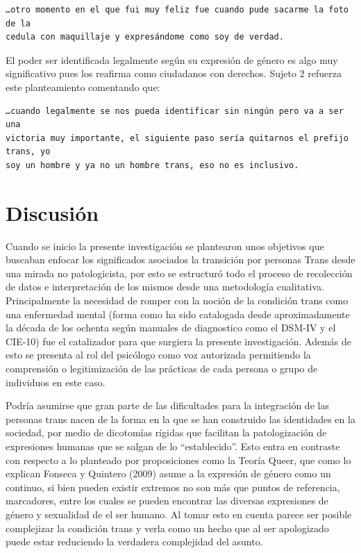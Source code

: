 \begin{verbatim}
…otro momento en el que fui muy feliz fue cuando pude sacarme la foto de la
cedula con maquillaje y expresándome como soy de verdad.
\end{verbatim}

El poder ser identificada legalmente según su expresión de género es algo muy
significativo pues los reafirma como ciudadanos con derechos. Sujeto 2 refuerza
este planteamiento comentando que:

\begin{verbatim}
…cuando legalmente se nos pueda identificar sin ningún pero va a ser una
victoria muy importante, el siguiente paso sería quitarnos el prefijo trans, yo
soy un hombre y ya no un hombre trans, eso no es inclusivo.
\end{verbatim}

\section{Discusión}\label{sec:discusion}

Cuando se inicio la presente investigación se plantearon unos objetivos que
buscaban enfocar los significados asociados la transición por personas Trans
desde una mirada no patologicista, por esto se estructuró todo el proceso de
recolección de datos e interpretación de los mismos desde una metodología
cualitativa. Principalmente la necesidad de romper con la noción de la condición
trans como una enfermedad mental (forma como ha sido catalogada desde
aproximadamente la década de los ochenta según manuales de diagnostico como el
DSM-IV y el CIE-10) fue el catalizador para que surgiera la presente
investigación. Además de esto se presenta al rol del psicólogo como voz
autorizada permitiendo la comprensión o legitimización de las prácticas de cada
persona o grupo de individuos en este caso.

Podría asumirse que gran parte de las dificultades para la integración de las
personas trans nacen de la forma en la que se han construido las identidades en
la sociedad, por medio de dicotomías rígidas que facilitan la patologización de
expresiones humanas que se salgan de lo “establecido”. Esto entra en contraste
con respecto a lo planteado por proposiciones como la Teoría Queer, que como lo
explican Fonseca y Quintero (2009) asume a la expresión de género como un
continuo, si bien pueden existir extremos no son más que puntos de referencia,
marcadores, entre los cuales se pueden encontrar las diversas expresiones de
género y sexualidad de el ser humano. Al tomar esto en cuenta parece ser posible
complejizar la condición trans y verla como un hecho que al ser apologizado
puede estar reduciendo la verdadera complejidad del asunto.

